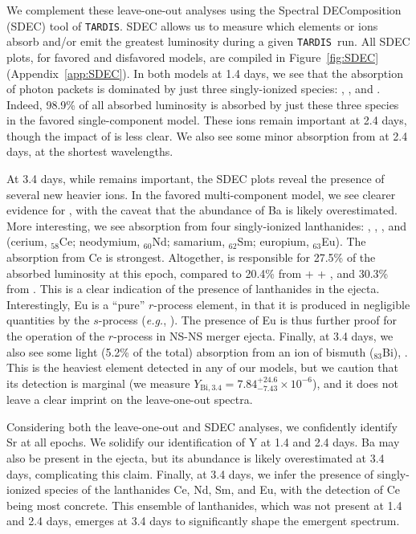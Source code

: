 \documentclass[twocolumn,twocolappendix]{aastex63}
\def\TARDIS{\texttt{TARDIS}}
\begin{document}
We complement these leave-one-out analyses using the Spectral DEComposition (SDEC) tool of \TARDIS. SDEC allows us to measure which elements or ions absorb and/or emit the greatest luminosity during a given \TARDIS~run. All SDEC plots, for favored and disfavored models, are compiled in Figure~\ref{fig:SDEC} (Appendix~\ref{app:SDEC}). In both models at 1.4 days, we see that the absorption of photon packets is dominated by just three singly-ionized species: , , and . Indeed, 98.9\% of all absorbed luminosity is absorbed by just these three species in the favored single-component model. These ions remain important at 2.4 days, though the impact of  is less clear. We also see some minor absorption from  at 2.4 days, at the shortest wavelengths.

At 3.4 days, while  remains important, the SDEC plots reveal the presence of several new heavier ions. In the favored multi-component model, we see clearer evidence for , with the caveat that the abundance of Ba is likely overestimated. More interesting, we see absorption from four singly-ionized lanthanides: , , , and  (cerium, ${}_{58}$Ce; neodymium, ${}_{60}$Nd; samarium, ${}_{62}$Sm; europium, ${}_{63}$Eu). The absorption from Ce is strongest. Altogether,  is responsible for 27.5\% of the absorbed luminosity at this epoch, compared to 20.4\% from  +  + , and 30.3\% from . This is a clear indication of the presence of lanthanides in the ejecta. Interestingly, Eu is a ``pure'' $r$-process element, in that it is produced in negligible quantities by the $s$-process (\textit{e.g.}, \citealt{bisterzo14}). The presence of Eu is thus further proof for the operation of the $r$-process in NS-NS merger ejecta. Finally, at 3.4 days, we also see some light (5.2\% of the total) absorption from an ion of bismuth (${}_{83}$Bi), . This is the heaviest element detected in any of our models, but we caution that its detection is marginal (we measure $Y_{\mathrm{Bi},3.4} = 7.84^{+24.6}_{-7.43} \times 10^{-6}$), and it does not leave a clear imprint on the leave-one-out spectra. 

Considering both the leave-one-out and SDEC analyses, we confidently identify Sr at all epochs. We solidify our identification of Y at 1.4 and 2.4 days. Ba may also be present in the ejecta, but its abundance is likely overestimated at 3.4 days, complicating this claim. Finally, at 3.4 days, we infer the presence of singly-ionized species of the lanthanides Ce, Nd, Sm, and Eu, with the detection of Ce being most concrete. This ensemble of lanthanides, which was not present at 1.4 and 2.4 days, emerges at 3.4 days to significantly shape the emergent spectrum. 
\end{document}

